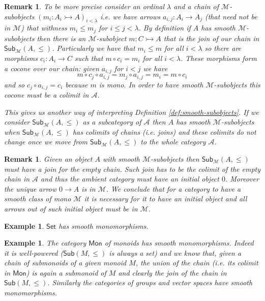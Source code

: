\documentclass[letterpaper, 11pt, oneside]{memoir}
\theoremstyle{myteo}
\newtheorem{example}[theorem]{Example}
\newtheorem{remark}[theorem]{Remark}
\numberwithin{equation}{section}
\newcommand{\Set}{\textsf{Set}}
\newcommand{\Sub}{\textsf{Sub}}
\newcommand{\A}{\mathscr{A}}
\begin{document}
\begin{remark}
  \label{rem:classes_and_initial}
  To be more precise consider an ordinal \(\lambda\) and a chain of \(\mathcal{M}\)-subobjects \((m_i : A_i \rightarrowtail A)_{i < \lambda}\) i.e. we have arrows \(a_{i,j} : A_i \to A_j\) (that need not be in \(\mathcal{M}\)) that withness \(m_i \leq m_j\) for \(i \leq j < \lambda\).
  By definition if \(A\) has smooth \(\mathcal{M}\)-subobjects then there is an \(\mathcal{M}\)-subobject \(m : C \rightarrowtail A\) that is the join of our chain in \(\Sub_\mathcal{M}(A, \leq)\).
  Particularly we have that \(m_i \leq m\) for all \(i < \lambda\) so there are morphisms \(c_i : A_i \to C\) such that \(m \circ c_i = m_i\) for all \(i < \lambda\).
  These morphisms form a cocone over our chain: given \(a_{i, j}\) for \(i < j\) we have
  \begin{equation*}
    m \circ c_j \circ a_{i, j} = m_j \circ a_{i, j} = m_i = m \circ c_i
  \end{equation*}
  and so \(c_j \circ a_{i, j} = c_i\) because \(m\) is mono.
  In order to have smooth \(\mathcal{M}\)-subobjects this cocone must be a colimit in \(\A\).

  This gives us another way of interpreting Definition \ref{def:smooth-subobjects}.
  If we consider \(\Sub_\mathcal{M}(A, \leq)\) as a subcategory of \(\A\) then \(A\) has smooth \(\mathcal{M}\)-subobjects when \(\Sub_\mathcal{M}(A, \leq)\) has colimits of chains (i.e. joins) and these colimits do not change once we move from \(\Sub_\mathcal{M}(A, \leq)\) to the whole category \(\A\).
\end{remark}

\begin{remark}
  Given an object \(A\) with smooth \(\mathcal{M}\)-subobjects then \(\Sub_\mathcal{M}(A, \leq)\) must have a join for the empty chain.
  Such join has to be the colimit of the empty chain in \(\A\) and thus the ambient category must have an initial object \(0\).
  Moreover the unique arrow \(0 \to A\) is in \(\mathcal{M}\).
  We conclude that for a category to have a smooth class of mono \(\mathcal{M}\) it is necessary for it to have an initial object and all arrows out of such initial object must be in \(\mathcal{M}\).
\end{remark}

\begin{example}
  \(\Set\) has smooth monomorphisms.
\end{example}

\begin{example}
  The category \(\textsf{Mon}\) of monoids has smooth monomorphisms.
  Indeed it is well-powered (\(\Sub(M, \leq)\) is always a set) and we know that, given a chain of submonoids of a given monoid \(M\), the union of the chain (i.e. its colimit in \(\textsf{Mon}\)) is again a submonoid of \(M\) and clearly the join of the chain in \(\Sub(M, \leq)\).
  Similarly the categories of groups and vector spaces have smooth monomorphisms.
\end{example}
\end{document}
